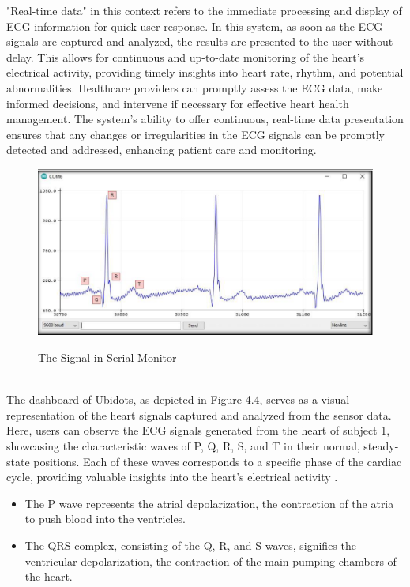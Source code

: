 "Real-time data" in this context refers to the immediate processing and display of ECG information for quick user response. In this system, as soon as the ECG signals are captured and analyzed, the results are presented to the user without delay. This allows for continuous and up-to-date monitoring of the heart's electrical activity, providing timely insights into heart rate, rhythm, and potential abnormalities. Healthcare providers can promptly assess the ECG data, make informed decisions, and intervene if necessary for effective heart health management. The system's ability to offer continuous, real-time data presentation ensures that any changes or irregularities in the ECG signals can be promptly detected and addressed, enhancing patient care and monitoring.
 \begin{figure}[htbp]
    \centering
     \includegraphics[width=0.9\linewidth]{C_chap/fig11.png}
\\\caption{The Signal in Serial Monitor}
 \end{figure}
\\
The dashboard of Ubidots, as depicted in Figure 4.4, serves as a visual representation of the heart signals captured and analyzed from the sensor data. Here, users can observe the ECG signals generated from the heart of subject 1, showcasing the characteristic waves of P, Q, R, S, and T in their normal, steady-state positions. Each of these waves corresponds to a specific phase of the cardiac cycle, providing valuable insights into the heart's electrical activity \cite{kleiman2021comparison}.
\begin{itemize}
    \item The P wave represents the atrial depolarization, the contraction of the atria to push blood into the ventricles.
\end{itemize}
\begin{itemize}
    \item The QRS complex, consisting of the Q, R, and S waves, signifies the ventricular depolarization, the contraction of the main pumping chambers of the heart.
\end{itemize}
